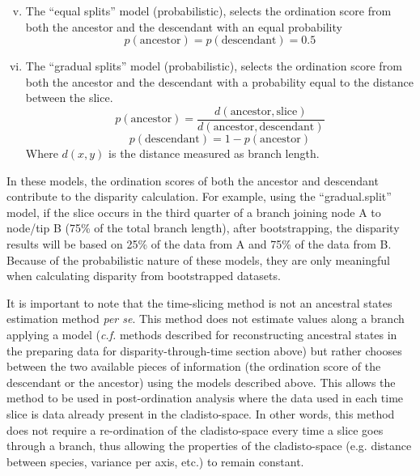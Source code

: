 \documentclass[12pt,a4paper]{article}
\begin{document}
\begin{enumerate}
    \begin{enumerate}[(i)]
    \setcounter{enumii}{4}
      \item The ``equal splits'' model (probabilistic), selects the ordination score from both the ancestor and the descendant with an equal probability
          \begin{equation}
          p(\text{ancestor}) = p(\text{descendant}) = 0.5
          \end{equation}

    \item The ``gradual splits'' model (probabilistic), selects the ordination score from both the ancestor and the descendant with a probability equal to the distance between the slice.
          \begin{equation}
              p(\text{ancestor}) = \frac{d(\text{ancestor},\text{slice})}{d(\text{ancestor},\text{descendant})}
          \end{equation}
          \begin{equation}
              p(\text{descendant}) = 1 - p(\text{ancestor})
          \end{equation}
    \noindent Where $d(x,y)$ is the distance measured as branch length.
    \end{enumerate}

    In these models, the ordination scores of both the ancestor and descendant contribute to the disparity calculation.
    For example, using the ``gradual.split'' model, if the slice occurs in the third quarter of a branch joining node A to node/tip B (75\% of the total branch length), after bootstrapping, the disparity results will be based on 25\% of the data from A and 75\% of the data from B.
    Because of the probabilistic nature of these models, they are only meaningful when calculating disparity from bootstrapped datasets.
\end{enumerate}

It is important to note that the time-slicing method is not an ancestral states estimation method \textit{per se}.
This method does not estimate values along a branch applying a model (\textit{c.f.} methods described for reconstructing ancestral states in the preparing data for disparity-through-time section above) but rather chooses between the two available pieces of information (the ordination score of the descendant or the ancestor) using the models described above.
This allows the method to be used in post-ordination analysis where the data used in each time slice is data already present in the cladisto-space.
In other words, this method does not require a re-ordination of the cladisto-space every time a slice goes through a branch, thus allowing the properties of the cladisto-space (e.g. distance between species, variance per axis, etc.) to remain constant.
 
\end{document}
